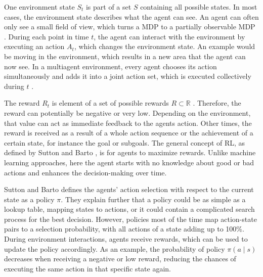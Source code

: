One environment state $S_t$ is part of a set $S$ containing all possible states. In most cases, the environment state describes what the agent can see. An agent can often only see a small field of view, which turns a MDP to a partially observable MDP \cite{suba18}. During each point in time $t$, the agent can interact with the environment by executing an action $A_t$, which changes the environment state. An example would be moving in the environment, which results in a new area that the agent can now see. In a multiagent environment, every agent chooses its action simultaneously and adds it into a joint action set, which is executed collectively during $t$ \cite{buba10}.

The reward $R_t$ is element of a set of possible rewards $R \subset \mathbb{R}$ \cite{suba18}. Therefore, the reward can potentially be negative or very low. Depending on the environment, that value can act as immediate feedback to the agents action. Other times, the reward is received as a result of a whole action sequence or the achievement of a certain state, for instance the goal or subgoals. The general concept of RL, as defined by Sutton and Barto \cite{suba18}, is for agents to maximize rewards. Unlike machine learning approaches, here the agent starts with no knowledge about good or bad actions and enhances the decision-making over time.

Sutton and Barto defines the agents' action selection with respect to the current state as a policy $\pi$. They explain further that a policy could be as simple as a lookup table, mapping states to actions, or it could contain a complicated search process for the best decision. However, policies most of the time map action-state pairs to a selection probability, with all actions of a state adding up to 100\%.
During environment interactions, agents receive rewards, which can be used to update the policy accordingly. As an example, the probability of policy $\pi(a \mid s)$ decreases when receiving a negative or low reward, reducing the chances of executing the same action in that specific state again.

